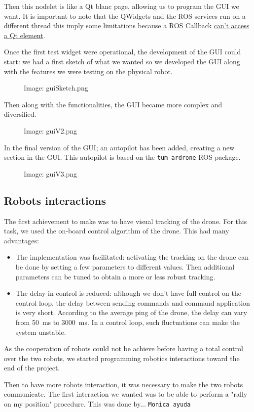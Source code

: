 \documentclass[11pt,a4paper]{article}
\newcommand{\centerImage}[1]{
	\begin{figure}[h]
	\centering
	Image: #1
	\end{figure}
}
\newcommand{\Monica}{\texttt{Monica ayuda}}
\begin{document}
Then this nodelet is like a Qt blanc page, allowing us to program the GUI we want. It is 
important to note that the QWidgets and the ROS services run on a different thread this 
imply some limitations because a ROS Callback
\href{http://wiki.ros.org/rqt/Tutorials/Writing\%20a\%20C\%2B\%2B\%20Plugin}
{can't access a Qt element}.

Once the first test widget were operational, the development of the GUI could start: we had a 
first sketch of what we wanted so we developed the GUI along with the features we were
testing on the physical robot.
\centerImage{guiSketch.png}

Then along with the functionalities, the GUI became more complex and diversified.
\centerImage{guiV2.png}

In the final version of the GUI; an autopilot has been added, creating a new section in the 
GUI. This autopilot is based on the \verb!tum_ardrone! ROS package.
\centerImage{guiV3.png}

\subsection{Robots interactions}
The first achievement to make was to have visual tracking of the drone. For this task, we used 
the on-board control algorithm of the drone. This had many advantages: 
\begin{itemize}
\item The implementation was facilitated: activating the tracking on the drone can be done by 
setting a few parameters to different values. Then additional parameters can be tuned to
obtain a more or less robust tracking.

\item The delay in control is reduced: although we don't have full control on the control
loop, the delay between sending commands and command application is very short. According to
the average ping of the drone, the delay can vary from 50~ms to 3000~ms. In a control loop,
such fluctuations can make the system unstable.
\end{itemize}

As the cooperation of robots could not be achieve before having a total control over the two robots, 
we started programming robotics interactions toward the end of the project.

Then to have more robots interaction, it was necessary to make the two robots communicate.
The first interaction we wanted was to be able to perform a "rally on my position" procedure.
This was done by...  \Monica
\end{document}

